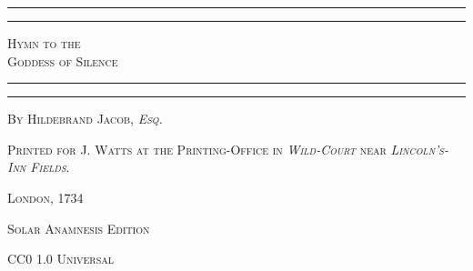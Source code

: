 \documentclass[a4paper, 11pt, oneside]{article}
\begin{document}
\begin{titlepage} %
	\centering %

	
	\rule{\textwidth}{1.6pt}\vspace*{-\baselineskip}\vspace*{2pt} %
	\rule{\textwidth}{0.4pt} %
	
	{\scshape\LARGE Hymn to the \\ Goddess of Silence}
	
	\rule{\textwidth}{0.4pt}\vspace*{-\baselineskip}\vspace{3.2pt} %
	\rule{\textwidth}{1.6pt} %

	
	\vspace{1\baselineskip}
	
	{\scshape By \Large Hildebrand Jacob, \emph{Esq.}} %
	





	
	


\vspace*{\fill}

	\vspace{1\baselineskip}

	{\footnotesize\scshape Printed for J. Watts at the Printing-Office in \emph{Wild-Court} near \emph{Lincoln's-Inn Fields}.}
	
	{\small\scshape{London, 1734}}
	
	\vspace{0.5\baselineskip} %



\scshape Solar Anamnesis Edition
	
	{\scshape\small CC0 1.0 Universal} %
\end{titlepage}
\setlength{\parskip}{1mm plus1mm minus1mm}
\setcounter{tocdepth}{3}
\setcounter{secnumdepth}{3}
\clearpage
\end{document}
